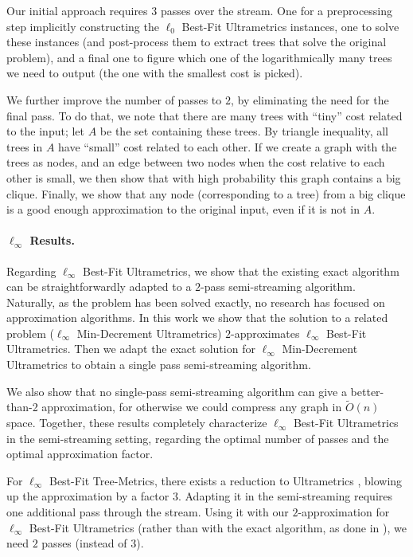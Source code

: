 \documentclass{article}
\begin{document}
Our initial approach requires $3$ passes over the stream. One for a preprocessing step implicitly constructing the $\ell_0$ Best-Fit Ultrametrics instances, one to solve these instances (and post-process them to extract trees that solve the original problem), and a final one to figure which one of the logarithmically many trees we need to output (the one with the smallest cost is picked).

We further improve the number of passes to $2$, by eliminating the need for the final pass.
To do that, we note that there are many trees with ``tiny'' cost related to the input; let $A$ be the set containing these trees.
By triangle inequality, all trees in $A$ have ``small'' cost related to each other.
If we create a graph with the trees as nodes, and an edge between two nodes when the cost relative to each other is small, we then show that with high probability this graph contains a big clique.
Finally, we show that any node (corresponding to a tree) from a big clique is a good enough approximation to the original input, even if it is not in $A$.

\paragraph*{$\ell_\infty$ Results.}
Regarding $\ell_\infty$ Best-Fit Ultrametrics, we show that the existing exact algorithm \cite{farach1993robust} can be straightforwardly adapted to a $2$-pass semi-streaming algorithm.
Naturally, as the problem has been solved exactly, no research has focused on approximation algorithms.
In this work we show that the solution to a related problem ($\ell_\infty$ Min-Decrement Ultrametrics) $2$-approximates $\ell_\infty$ Best-Fit Ultrametrics.
Then we adapt the exact solution for $\ell_\infty$ Min-Decrement Ultrametrics \cite{farach1993robust} to obtain a single pass semi-streaming algorithm.

We also show that no single-pass semi-streaming algorithm can give a better-than-2 approximation, for otherwise we could compress any graph in $\widetilde{O}(n)$ space.
Together, these results completely characterize $\ell_\infty$ Best-Fit Ultrametrics in the semi-streaming setting, regarding the optimal number of passes and the optimal approximation factor.

For $\ell_\infty$ Best-Fit Tree-Metrics, there exists a reduction to Ultrametrics \cite{agarwala}, blowing up the approximation by a factor $3$.
Adapting it in the semi-streaming requires one additional pass through the stream.
Using it with our $2$-approximation for $\ell_\infty$ Best-Fit Ultrametrics (rather than with the exact algorithm, as done in \cite{agarwala}),
we need $2$ passes (instead of $3$).
\end{document}
